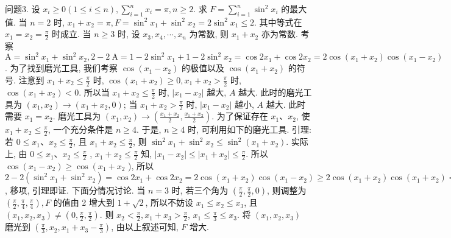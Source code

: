 问题3. 设 $x_i \geqslant 0(1 \leqslant i \leqslant n), \sum_{i=1}^n x_i=\pi, n \geqslant 2$. 求 $F=\sum_{i=1}^n \sin ^2 x_i$ 的最大值.
当 $n=2$ 时, $x_1+x_2=\pi, F=\sin ^2 x_1+\sin ^2 x_2=2 \sin ^2 x_1 \leqslant 2$. 其中等式在 $x_1=x_2=\frac{\pi}{2}$ 时成立.
当 $n \geqslant 3$ 时, 设 $x_3, x_4, \cdots, x_n$ 为常数, 则 $x_1+x_2$ 亦为常数.
考察 $\mathrm{A}=\sin ^2 x_1+\sin ^2 x_2, 2-2 \mathrm{~A}=1-2 \sin ^2 x_1+1-2 \sin ^2 x_2= \cos 2 x_1+\cos 2 x_2=2 \cos \left(x_1+x_2\right) \cos \left(x_1-x_2\right)$. 为了找到磨光工具, 我们考察 $\cos \left(x_1-x_2\right)$ 的极值以及 $\cos \left(x_1+x_2\right)$ 的符号.
注意到 $x_1+x_2 \leqslant \frac{\pi}{2}$ 时, $\cos \left(x_1+x_2\right) \geqslant 0, x_1+x_2>\frac{\pi}{2}$ 时, $\cos \left(x_1+x_2\right)<0$. 所以当 $x_1+x_2 \leqslant \frac{\pi}{2}$ 时, $\left|x_1-x_2\right|$ 越大, $A$ 越大.
此时的磨光工具为 $\left(x_1, x_2\right) \rightarrow\left(x_1+x_2, 0\right)$; 当 $x_1+ x_2>\frac{\pi}{2}$ 时, $\left|x_1-x_2\right|$ 越小, $A$ 越大.
此时需要 $x_1=x_2$. 磨光工具为 $\left(x_1, x_2\right) \rightarrow \left(\frac{x_1+x_2}{2}, \frac{x_1+x_2}{2}\right)$. 为了保证存在 $x_1 、 x_2$, 使 $x_1+x_2 \leqslant \frac{\pi}{2}$, 一个充分条件是 $n \geqslant 4$. 于是, $n \geqslant 4$ 时, 可利用如下的磨光工具.
引理: 若 $0 \leqslant x_1 、 x_2 \leqslant \frac{\pi}{2}$, 且 $x_1+x_2 \leqslant \frac{\pi}{2}$, 则 $\sin ^2 x_1+\sin ^2 x_2 \leqslant \sin ^2\left(x_1+x_2\right)$. 实际上, 由 $0 \leqslant x_1 、 x_2 \leqslant \frac{\pi}{2}$ , $x_1+x_2 \leqslant \frac{\pi}{2}$ 知, $\left|x_1-x_2\right| \leqslant\left|x_1+x_2\right| \leqslant \frac{\pi}{2}$. 所以 $\cos \left(x_1-x_2\right) \geqslant \cos \left(x_1+\right. x_2$ ), 所以 $2-2\left(\sin ^2 x_1+\sin ^2 x_2\right)=\cos 2 x_1+\cos 2 x_2=2 \cos \left(x_1+x_2\right) \cos \left(x_1-\right. \left.x_2\right) \geqslant 2 \cos \left(x_1+x_2\right) \cos \left(x_1+x_2\right)=2 \cos ^2\left(x_1+x_2\right)=2\left[1-\sin ^2\left(x_1+x_2\right)\right]= 2-2 \sin ^2\left(x_1+x_2\right)$, 移项, 引理即证.
下面分情况讨论.
当 $n=3$ 时, 若三个角为 $\left(\frac{\pi}{2}, \frac{\pi}{2}, 0\right)$, 则调整为 $\left(\frac{\pi}{2}, \frac{\pi}{4}, \frac{\pi}{4}\right), F$ 的值由 2 增大到 $1+\sqrt{2}$, 所以不妨设
$x_1 \leqslant x_2 \leqslant x_3$, 且 $\left(x_1, x_2, x_3\right) \neq\left(0, \frac{\pi}{2}, \frac{\pi}{2}\right)$. 则 $x_2<\frac{\pi}{2}, x_1+x_3>\frac{\pi}{2}$, $x_1 \leqslant \frac{\pi}{3} \leqslant x_3$. 将 $\left(x_1, x_2, x_3\right)$ 磨光到 $\left(\frac{\pi}{3}, x_2, x_1+x_3-\frac{\pi}{3}\right)$, 由以上叙述可知, $F$ 增大.
